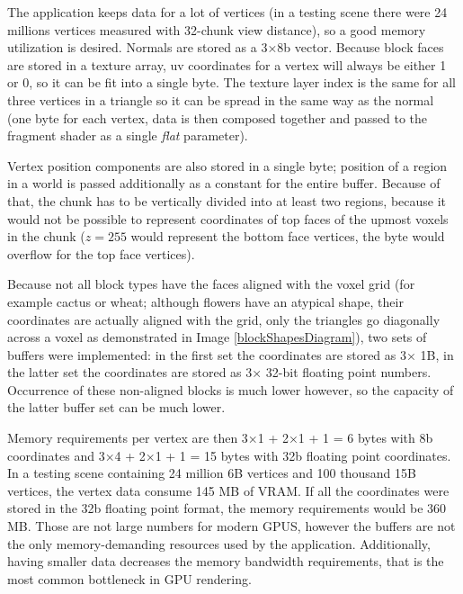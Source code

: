 
The application keeps data for a lot of vertices (in a testing scene there were 24 millions vertices measured with 32-chunk view distance), so a good memory utilization is desired. Normals are stored as a 3×8b vector. Because block faces are stored in a texture array, uv coordinates for a vertex will always be either 1 or 0, so it can be fit into a single byte. The texture layer index is the same for all three vertices in a triangle so it can be spread in the same way as the normal (one byte for each vertex, data is then composed together and passed to the fragment shader as a single \textit{flat} parameter). 

Vertex position components are also stored in a single byte; position of a region in a world is passed additionally as a constant for the entire buffer. Because of that, the chunk has to be vertically divided into at least two regions, because it would not be possible to represent coordinates of top faces of the upmost voxels in the chunk ($z = 255$ would represent the bottom face vertices, the byte would overflow for the top face vertices).

Because not all block types have the faces aligned with the voxel grid (for example cactus or wheat; although flowers have an atypical shape, their coordinates are actually aligned with the grid, only the triangles go diagonally across a voxel as demonstrated in Image \ref{blockShapesDiagram}), two sets of buffers were implemented: in the first set the coordinates are stored as 3× 1B, in the latter set the coordinates are stored as 3× 32-bit floating point numbers. Occurrence of these non-aligned blocks is much lower however, so the capacity of the latter buffer set can be much lower.


Memory requirements per vertex are then 3×1 + 2×1 + 1 = 6 bytes with 8b coordinates and 3×4 + 2×1 + 1 = 15 bytes with 32b floating point coordinates. In a testing scene containing 24 million 6B vertices and 100 thousand 15B vertices, the vertex data consume 145 MB of VRAM. If all the coordinates were stored in the 32b floating point format, the memory requirements would be 360 MB. Those are not large numbers for modern GPUS, however the buffers are not the only memory-demanding resources used by the application. Additionally, having smaller data decreases the memory bandwidth requirements, that is the most common bottleneck in GPU rendering.

